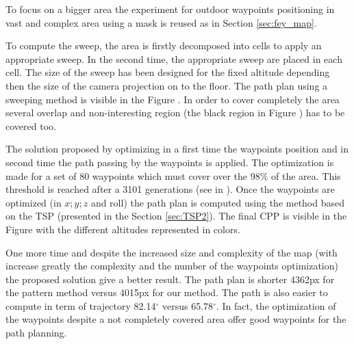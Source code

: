 To focus on a bigger area the experiment for outdoor waypoints positioning in vast and complex area using a mask  is reused as in Section \ref{sec:fey_map}. %

To compute the sweep, the area is firstly decomposed into cells to apply an appropriate sweep. In the second time, the appropriate sweep are placed in each cell. The size of the sweep has been designed for the fixed altitude depending then the size of the camera projection on to the floor.%
The path plan using a sweeping method is visible in the Figure . In order to cover completely the area several overlap and non-interesting region (the black region in Figure ) has to be covered too. 

The solution proposed by optimizing in a first time the waypoints position and in second time the path passing by the waypoints is applied. The optimization is made for a set of 80 waypoints which must cover over the 98\% of the area. This threshold is reached after a 3101 generations (see in ). Once the waypoints are optimized (in $x;y;z$ and roll) the path plan is computed using the method based on the TSP (presented in the Section \ref{sec:TSP2}). The final CPP is visible in the Figure  with the different altitudes represented in colors.

One more time and despite the increased size and complexity of the map (with increase greatly the complexity and the number of the waypoints optimization) the proposed solution give a better result. The path plan is shorter 4362px for the pattern method versus 4015px for our method. The path is also easier to compute in term of trajectory 82.14$^\circ$ versus 65.78$^\circ$.
In fact, the optimization of the waypoints despite a not completely covered area offer good waypoints for the path planning. %

  
